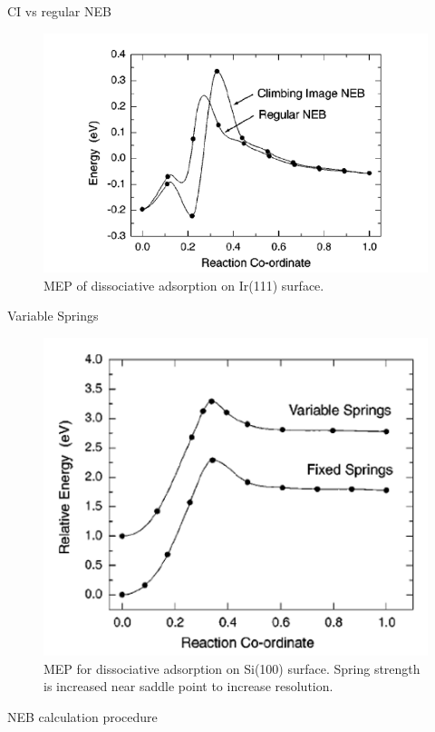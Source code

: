 \documentclass[aspectratio=169]{beamer}
\begin{document}
    \begin{frame}{CI vs regular NEB}
        \begin{figure}
            \centering
            \includegraphics[width=0.6\linewidth]{lectures/figures/12-CINEB_2.png}
            \caption{MEP of  dissociative adsorption on Ir(111) surface.\cite{henkelmanClimbingImageNudged2000}}
        \end{figure}
    \end{frame}

    \begin{frame}{Variable Springs}

        \begin{figure}
            \centering
            \includegraphics[width=0.4\linewidth]{lectures/figures/12-variable_springs.png}
            \caption{MEP for  dissociative adsorption on Si(100) surface. Spring strength is increased near saddle point to increase resolution.\cite{henkelmanClimbingImageNudged2000}}
        \end{figure}
    \end{frame}

    \begin{frame}{NEB calculation procedure}
        \begin{figure}
            \centering
        \end{figure}
    \end{frame}
\end{document}
